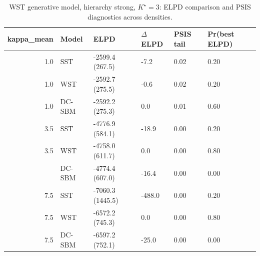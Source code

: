 \begin{table}
\centering
\caption{WST generative model, hierarchy strong, $K^\star=3$: ELPD comparison and PSIS diagnostics across densities.}
\centering
\begin{tabular}[t]{rlllll}
\toprule
kappa_mean & Model & ELPD & $\Delta$ELPD & PSIS tail & Pr(best ELPD)\\
\midrule
1.0 & SST & -2599.4 (267.5) & -7.2 & 0.02 & 0.20\\
1.0 & WST & -2592.7 (275.5) & -0.6 & 0.02 & 0.20\\
1.0 & DC-SBM & -2592.2 (275.3) & 0.0 & 0.01 & 0.60\\
3.5 & SST & -4776.9 (584.1) & -18.9 & 0.00 & 0.20\\
3.5 & WST & -4758.0 (611.7) & 0.0 & 0.00 & 0.80\\
\addlinespace
3.5 & DC-SBM & -4774.4 (607.0) & -16.4 & 0.00 & 0.00\\
7.5 & SST & -7060.3 (1445.5) & -488.0 & 0.00 & 0.20\\
7.5 & WST & -6572.2 (745.3) & 0.0 & 0.00 & 0.80\\
7.5 & DC-SBM & -6597.2 (752.1) & -25.0 & 0.00 & 0.00\\
\bottomrule
\end{tabular}
\end{table}
